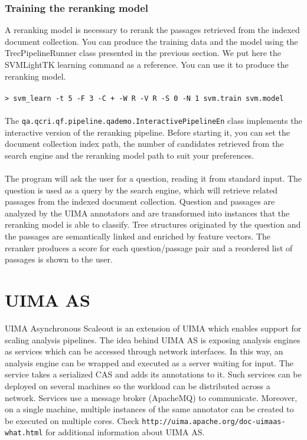 \documentclass{wileysev}
\begin{document}
\subsection{Training the reranking model}
A reranking model is necessary to rerank the passages retrieved from the indexed document collection. You can produce the training data and the model using the TrecPipelineRunner class presented in the previous section. We put here the SVMLightTK learning command as a reference. You can use it to produce the reranking model.
\\\\
\texttt{\small{> svm\_learn -t 5 -F 3 -C + -W R -V R -S 0 -N 1 svm.train svm.model}}
\\\\
The \texttt{qa.qcri.qf.pipeline.qademo.InteractivePipelineEn} class implements the interactive version of the reranking pipeline. Before starting it, you can set the document collection index path, the number of candidates retrieved from the search engine and the reranking model path to suit your preferences.
\\\\
The program will ask the user for a question, reading it from standard input. The question is used as a query by the search engine, which will retrieve related passages from the indexed document collection. Question and passages are analyzed by the UIMA annotators and are transformed into instances that the reranking model is able to classify. Tree structures originated by the question and the passages are semantically linked and enriched by feature vectors. The reranker produces a score for each question/passage pair and a reordered list of passages is shown to the user.

\chapter[UIMA AS]{UIMA AS}

UIMA Asynchronous Scaleout is an extension of UIMA which enables support for scaling analysis pipelines. The idea behind UIMA AS is exposing analysis engines as services which can be accessed through network interfaces. In this way, an analysis engine can be wrapped and executed as a server waiting for input. The service takes a serialized CAS and adds its annotations to it. Such services can be deployed on several machines so the workload can be distributed across a network. Services use a message broker (ApacheMQ) to communicate. Moreover, on a single machine, multiple instances of the same annotator can be created to be executed on multiple cores. Check \texttt{http://uima.apache.org/doc-uimaas-what.html} for additional information about UIMA AS.
\end{document}
